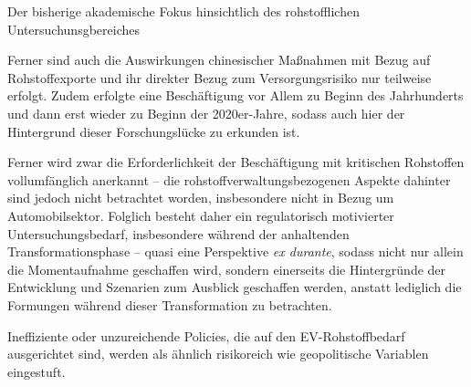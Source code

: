 \documentclass[12pt,a4paper,oneside]{book} %
\begin{document}
Der bisherige akademische Fokus hinsichtlich des rohstofflichen Untersuchunsgbereiches 

Ferner sind auch die Auswirkungen chinesischer Maßnahmen mit Bezug auf Rohstoffexporte und ihr direkter Bezug zum Versorgungsrisiko nur teilweise erfolgt. Zudem erfolgte eine Beschäftigung vor Allem zu Beginn des Jahrhunderts und dann erst wieder zu Beginn der 2020er-Jahre, sodass auch hier der Hintergrund dieser Forschungslücke zu erkunden ist.

Ferner wird zwar die Erforderlichkeit der Beschäftigung mit kritischen Rohstoffen vollumfänglich anerkannt -- die rohstoffverwaltungsbezogenen Aspekte dahinter sind jedoch nicht betrachtet worden, insbesondere nicht in Bezug um Automobilsektor. Folglich besteht daher ein regulatorisch motivierter Untersuchungsbedarf, insbesondere während der anhaltenden Transformationsphase -- quasi eine Perspektive \textit{ex durante}, sodass nicht nur allein die Momentaufnahme geschaffen wird, sondern einerseits die Hintergründe der Entwicklung und Szenarien zum Ausblick geschaffen werden, anstatt lediglich die Formungen während dieser Transformation zu betrachten.

Ineffiziente oder unzureichende Policies, die auf den EV-Rohstoffbedarf ausgerichtet sind, werden als ähnlich risikoreich wie geopolitische Variablen eingestuft.\autocite{Nagy, Will the EU have enough minerals to drive their electric dreams by 2030?}
\end{document}
